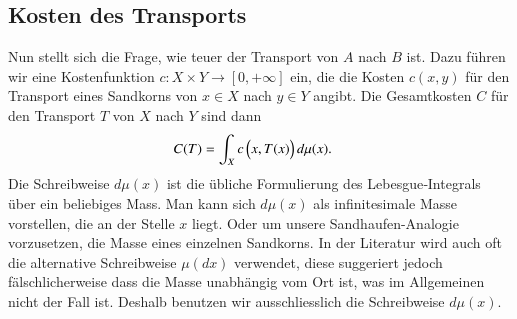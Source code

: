 \subsection{Kosten des Transports\label{mongekant:subsection:transport_cost}}
Nun stellt sich die Frage,
wie \glqq teuer\grqq{} der Transport von $A$ nach $B$ ist.
Dazu führen wir eine Kostenfunktion $c : X \times Y \to [0, +\infty]$ ein,
die die Kosten $c(x,y)$ für den Transport eines Sandkorns
von $x \in X$ nach $y \in Y$ angibt.
Die Gesamtkosten $C$ für den Transport $T$ von $X$ nach $Y$ sind dann
\begin{align}
C(T)
&=
\int_X c\,\Bigl(x, T(x)\Bigr) \, d\mu(x)
\label{mongekant:eq:monge_transport_cost}
.
\end{align}
Die Schreibweise $d\mu(x)$ ist die übliche Formulierung des
Lebesgue‑Integrals über ein beliebiges Mass.
Man kann sich $d\mu(x)$ als \glqq infinitesimale Masse\grqq{} vorstellen,
die an der Stelle $x$ liegt.
Oder um unsere Sandhaufen-Analogie vorzusetzen,
die Masse eines einzelnen Sandkorns.
In der Literatur wird auch oft die alternative Schreibweise $\mu(dx)$ verwendet,
diese suggeriert jedoch fälschlicherweise dass die Masse unabhängig vom Ort ist,
was im Allgemeinen nicht der Fall ist.
Deshalb benutzen wir ausschliesslich die Schreibweise $d\mu(x)$.

